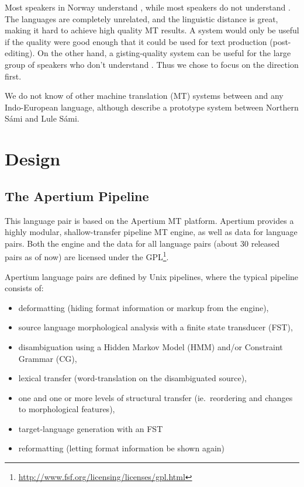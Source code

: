 Most \sme{} speakers in Norway understand \nob{}, while most \nob{}
speakers do not understand \sme{}. The languages are completely
unrelated, and the linguistic distance is great, making it hard to
achieve high quality MT results. A \nobsme{} system would only be useful if the
quality were good enough that it could be used for text production
(post-editing). On the other hand, a \smenob{} gisting-quality system
can be useful for the large group of \nob{} speakers who don't
understand \sme{}. Thus we chose to focus on the \smenob{} direction
first.

We do not know of other machine translation (MT) systems between \sme
and any Indo-European language, although \citet{tyers2009dpm} describe
a prototype system between Northern Sámi and Lule Sámi.



\section{Design}
 \label{sec:design}

\subsection{The Apertium Pipeline}
This language pair is based on the Apertium MT
platform\citep{forcada2011afp}. Apertium provides a highly modular,
shallow-transfer pipeline MT engine, as well as data for language
pairs. Both the engine and the data for all language pairs (about 30
released pairs as of now) are licensed under the
GPL\footnote{\href{http://www.fsf.org/licensing/licenses/gpl.html}{http://www.fsf.org/licensing/licenses/gpl.html}}.

Apertium language pairs are defined by Unix pipelines, where the
typical pipeline consists of:

\begin{itemize}
\item deformatting (hiding format information or markup from the
  engine),
\item source language morphological analysis with a finite state
  transducer (FST),
\item disambiguation using a Hidden Markov Model (HMM) and/or
  Constraint Grammar (CG), 
\item lexical transfer (word-translation on the disambiguated source),
\item one and one or more levels of structural transfer
  (ie.~reordering and changes to morphological features), 
\item target-language generation with an FST
\item reformatting (letting format information be shown again)
\end{itemize}

